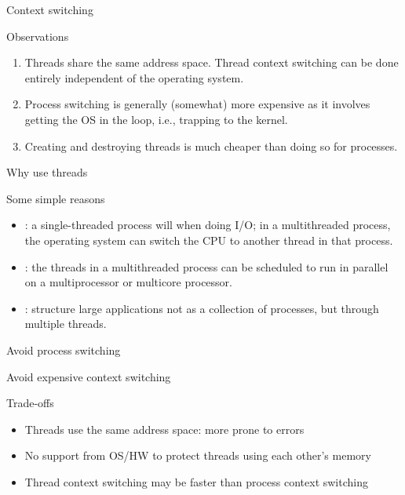 \begin{slide}{Context switching}
  \begin{block}{Observations}
    \begin{enumerate}
    \item Threads share the same address space. Thread context switching can be done entirely independent of
      the operating system.
    \item Process switching is generally (somewhat) more expensive as it involves getting the OS in the loop,
      i.e., trapping to the kernel.
    \item Creating and destroying threads is much cheaper than doing so for processes.
    \end{enumerate}
  \end{block}
\end{slide}
\begin{slide}{Why use threads}
  \begin{block}{Some simple reasons}
    \begin{itemize}
    \item {}: a single-threaded process will  when doing I/O; in a
      multithreaded process, the operating system can switch the CPU to another thread in that process.
    \item {}: the threads in a multithreaded process can be scheduled to run in
      parallel on a multiprocessor or multicore processor.
    \item {}: structure large applications not as a collection of processes, but
      through multiple threads.
    \end{itemize}
  \end{block}
\end{slide}
\begin{slide}{Avoid process switching}
  \begin{block}{Avoid expensive context switching}
    \begin{centerfig}
    \end{centerfig}
  \end{block}
  \begin{block}{Trade-offs}
    \begin{itemize}
    \item Threads use the same address space: more prone to errors
    \item No support from OS/HW to protect threads using each other's memory
    \item Thread context switching may be faster than process context switching
    \end{itemize}
  \end{block}
\end{slide}

